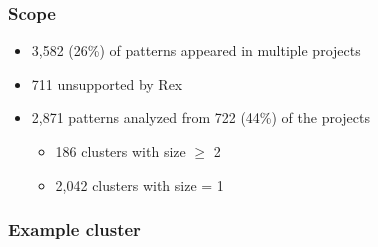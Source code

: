 
\begin{frame}
\frametitle{Scope}

\begin{itemize}
\item 3,582 (26\%) of patterns appeared in multiple projects 
\item 711 unsupported by Rex
\vspace{12pt}
\item<2-> 2,871 patterns analyzed from 722 (44\%) of the projects
\begin{itemize}
\item<2->186 clusters with size $\geq$ 2
\item<2-> 2,042 clusters with size = 1
\end{itemize}
\end{itemize}

\end{frame}

\begin{frame}[fragile]
\frametitle{Example cluster}
\vspace{-24pt}


\end{frame}




